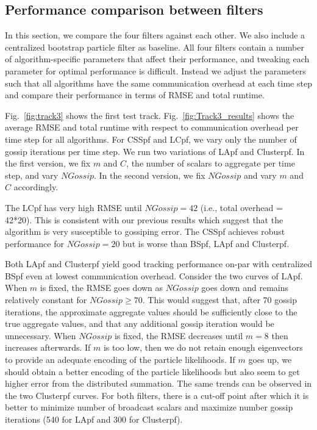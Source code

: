 \documentclass[10pt,letterpaper,final]{article}
\begin{document}
\subsection{Performance comparison between filters}
In this section, we compare the four filters against each other. We also include a centralized bootstrap particle filter as baseline. All four filters contain a number of algorithm-specific parameters that affect their performance, and tweaking each parameter for optimal performance is difficult. Instead we adjust the parameters such that all algorithms have the same communication overhead at each time step and compare their performance in terms of RMSE and total runtime. 

Fig.~\ref{fig:track3} shows the first test track. Fig.~\ref{fig:Track3_results} shows the average RMSE and total runtime with respect to communication overhead per time step for all algorithms. For CSSpf and LCpf, we vary only the number of gossip iterations per time step. We run two variations of LApf and Clusterpf. In the first version, we fix $m$ and $C$, the number of scalars to aggregate per time step, and vary $NGossip$. In the second version, we fix $NGossip$ and vary $m$ and $C$ accordingly. 

The LCpf has very high RMSE until $NGossip=42$ (i.e., total overhead = 42*20). This is consistent with our previous results which suggest that the algorithm is very susceptible to gossiping error. The CSSpf achieves robust performance for $NGossip=20$ but is worse than BSpf, LApf and Clusterpf. 

Both LApf and Clusterpf yield good tracking performance on-par with centralized BSpf even at lowest communication overhead. Consider the two curves of LApf. When $m$ is fixed, the RMSE goes down as $NGossip$ goes down and remains relatively constant for $NGossip\geq 70$. This would suggest that, after 70 gossip iterations, the approximate aggregate values should be sufficiently close to the true aggregate values, and that any additional gossip iteration would be unnecessary. When $NGossip$ is fixed, the RMSE decreases until $m=8$ then increases afterwards. If $m$ is too low, then we do not retain enough eigenvectors to provide an adequate encoding of the particle likelihoods. If $m$ goes up, we should obtain a better encoding of the particle likelihoods but also seem to get higher error from the distributed summation. The same trends can be observed in the two Clusterpf curves. For both filters, there is a cut-off point after which it is better to minimize number of broadcast scalars and maximize number gossip iterations (540 for LApf and 300 for Clusterpf). 
\end{document}
